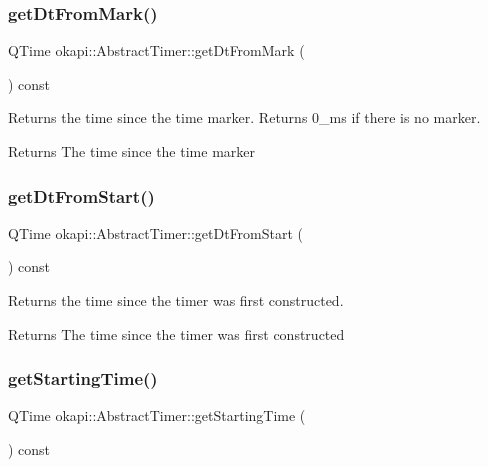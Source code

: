 \subsubsection{\texorpdfstring{getDtFromMark()}{getDtFromMark()}}
{\footnotesize\ttfamily Q\+Time okapi\+::\+Abstract\+Timer\+::get\+Dt\+From\+Mark (\begin{DoxyParamCaption}{ }\end{DoxyParamCaption}) const\hspace{0.3cm}{\ttfamily [virtual]}}

Returns the time since the time marker. Returns 0\+\_\+ms if there is no marker.

\begin{DoxyReturn}{Returns}
The time since the time marker 
\end{DoxyReturn}
\mbox{\label{classokapi_1_1AbstractTimer_ac681cdd9a5147df0b796e9af836502c8}} 
\subsubsection{\texorpdfstring{getDtFromStart()}{getDtFromStart()}}
{\footnotesize\ttfamily Q\+Time okapi\+::\+Abstract\+Timer\+::get\+Dt\+From\+Start (\begin{DoxyParamCaption}{ }\end{DoxyParamCaption}) const\hspace{0.3cm}{\ttfamily [virtual]}}

Returns the time since the timer was first constructed.

\begin{DoxyReturn}{Returns}
The time since the timer was first constructed 
\end{DoxyReturn}
\mbox{\label{classokapi_1_1AbstractTimer_a4707dcc563e750ee491918d7c5755bc3}} 
\subsubsection{\texorpdfstring{getStartingTime()}{getStartingTime()}}
{\footnotesize\ttfamily Q\+Time okapi\+::\+Abstract\+Timer\+::get\+Starting\+Time (\begin{DoxyParamCaption}{ }\end{DoxyParamCaption}) const\hspace{0.3cm}{\ttfamily [virtual]}}

